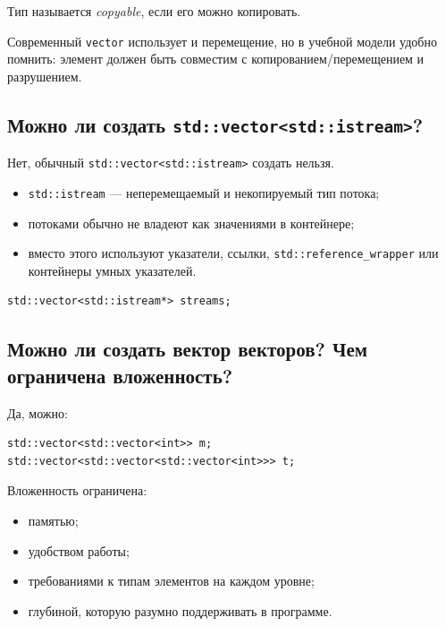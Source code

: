 \begin{definition}[Copyable]
Тип называется \textit{copyable}, если его можно копировать.
\end{definition}

\begin{remark}
Современный \texttt{vector} использует и перемещение, но в учебной модели удобно помнить: элемент должен быть совместим с копированием/перемещением и разрушением.
\end{remark}

\subsection{Можно ли создать \texttt{std::vector<std::istream>}?}
Нет, обычный \texttt{std::vector<std::istream>} создать нельзя.

\begin{itemize}
    \item \texttt{std::istream} — неперемещаемый и некопируемый тип потока;
    \item потоками обычно не владеют как значениями в контейнере;
    \item вместо этого используют указатели, ссылки, \texttt{std::reference\_wrapper} или контейнеры умных указателей.
\end{itemize}

\begin{example}
\begin{verbatim}
std::vector<std::istream*> streams;
\end{verbatim}
\end{example}

\subsection{Можно ли создать вектор векторов? Чем ограничена вложенность?}
Да, можно:
\begin{verbatim}
std::vector<std::vector<int>> m;
std::vector<std::vector<std::vector<int>>> t;
\end{verbatim}

Вложенность ограничена:
\begin{itemize}
    \item памятью;
    \item удобством работы;
    \item требованиями к типам элементов на каждом уровне;
    \item глубиной, которую разумно поддерживать в программе.
\end{itemize}

